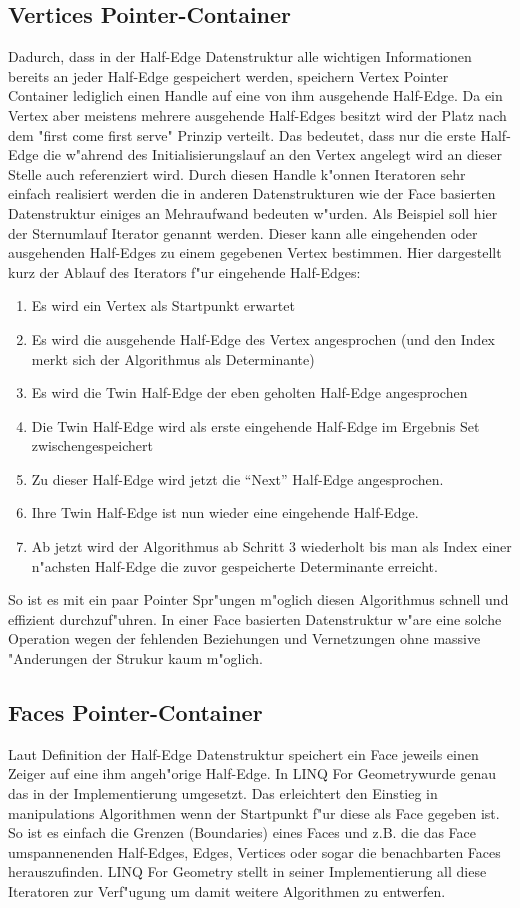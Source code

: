 \documentclass[pagesize, paper=a4, fontsize=12pt,titlepage=true, headings=small, headnosepline, abstractoff, liststotoc, nochapterprefix, plainheadsepline]{scrreprt}
\newcommand{\LFG}{LINQ For Geometry}
\newcommand{\LFGS}{LINQ For Geometry }
\newcommand{\HES}{Half-Edge Datenstruktur }
\begin{document}
		\subsection {Vertices Pointer-Container}
			Dadurch, dass in der Half-Edge Datenstruktur alle wichtigen Informationen bereits an jeder Half-Edge gespeichert werden, speichern Vertex Pointer Container lediglich einen Handle auf eine von ihm ausgehende Half-Edge. Da ein Vertex aber meistens mehrere ausgehende Half-Edges besitzt wird der Platz nach dem "first come first serve" Prinzip verteilt. Das bedeutet, dass nur die erste Half-Edge die w"ahrend des Initialisierungslauf an den Vertex angelegt wird an dieser Stelle auch referenziert wird. Durch diesen Handle k"onnen Iteratoren sehr einfach realisiert werden die in anderen Datenstrukturen wie der Face basierten Datenstruktur einiges an Mehraufwand bedeuten w"urden. Als Beispiel soll hier der Sternumlauf Iterator genannt werden. Dieser kann alle eingehenden oder ausgehenden Half-Edges zu einem gegebenen Vertex bestimmen. Hier dargestellt kurz der Ablauf des Iterators f"ur eingehende Half-Edges:
\begin{enumerate}
\item Es wird ein Vertex als Startpunkt erwartet
\item Es wird die ausgehende Half-Edge des Vertex angesprochen (und den Index merkt sich der Algorithmus als Determinante)
\item Es wird die Twin Half-Edge der eben geholten Half-Edge angesprochen
\item Die Twin Half-Edge wird als erste eingehende Half-Edge im Ergebnis Set zwischengespeichert
\item Zu dieser Half-Edge wird jetzt die "`Next"' Half-Edge angesprochen.
\item Ihre Twin Half-Edge ist nun wieder eine eingehende Half-Edge.
\item Ab jetzt wird der Algorithmus ab Schritt 3 wiederholt bis man als Index einer n"achsten Half-Edge die zuvor gespeicherte Determinante erreicht.
\end{enumerate}

So ist es mit ein paar Pointer Spr"ungen m"oglich diesen Algorithmus schnell und effizient durchzuf"uhren. In einer Face basierten Datenstruktur w"are eine solche Operation wegen der fehlenden Beziehungen und Vernetzungen ohne massive "Anderungen der Strukur kaum m"oglich.
		\subsection {Faces Pointer-Container}
			Laut Definition der \HES speichert ein Face jeweils einen Zeiger auf eine ihm angeh"orige Half-Edge. In \LFG wurde genau das in der Implementierung umgesetzt. Das erleichtert den Einstieg in manipulations Algorithmen wenn der Startpunkt f"ur diese als Face gegeben ist. So ist es einfach die Grenzen (Boundaries) eines Faces und z.B. die das Face umspannenenden Half-Edges, Edges, Vertices oder sogar die benachbarten Faces herauszufinden. \LFGS stellt in seiner Implementierung all diese Iteratoren zur Verf"ugung um damit weitere Algorithmen zu entwerfen.
\end{document}

